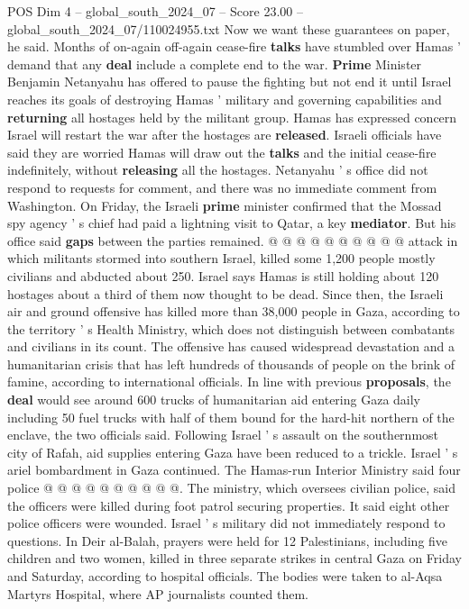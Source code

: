 \begin{textsample}{POS Dim 4 – global\_south\_2024\_07 – Score 23.00 – global\_south\_2024\_07/110024955.txt}
Now we want these guarantees on paper, he said.
Months of on-again off-again cease-fire \textbf{talks} have stumbled over Hamas ' demand that any \textbf{deal} include a complete end to the war. \textbf{Prime} Minister Benjamin Netanyahu has offered to pause the fighting but not end it until Israel reaches its goals of destroying Hamas ' military and governing capabilities and \textbf{returning} all hostages held by the militant group.
Hamas has expressed concern Israel will restart the war after the hostages are \textbf{released}.
Israeli officials have said they are worried Hamas will draw out the \textbf{talks} and the initial cease-fire indefinitely, without \textbf{releasing} all the hostages.
Netanyahu ' s office did not respond to requests for comment, and there was no immediate comment from Washington.
On Friday, the Israeli \textbf{prime} minister confirmed that the Mossad spy agency ' s chief had paid a lightning visit to Qatar, a key \textbf{mediator}.
But his office said \textbf{gaps} between the parties remained. @ @ @ @ @ @ @ @ @ @ attack in which militants stormed into southern Israel, killed some 1,200 people mostly civilians and abducted about 250.
Israel says Hamas is still holding about 120 hostages about a third of them now thought to be dead.
Since then, the Israeli air and ground offensive has killed more than 38,000 people in Gaza, according to the territory ' s Health Ministry, which does not distinguish between combatants and civilians in its count.
The offensive has caused widespread devastation and a humanitarian crisis that has left hundreds of thousands of people on the brink of famine, according to international officials.
In line with previous \textbf{proposals}, the \textbf{deal} would see around 600 trucks of humanitarian aid entering Gaza daily including 50 fuel trucks with half of them bound for the hard-hit northern of the enclave, the two officials said.
Following Israel ' s assault on the southernmost city of Rafah, aid supplies entering Gaza have been reduced to a trickle.
Israel ' s ariel bombardment in Gaza continued.
The Hamas-run Interior Ministry said four police @ @ @ @ @ @ @ @ @ @.
The ministry, which oversees civilian police, said the officers were killed during foot patrol securing properties.
It said eight other police officers were wounded.
Israel ' s military did not immediately respond to questions.
In Deir al-Balah, prayers were held for 12 Palestinians, including five children and two women, killed in three separate strikes in central Gaza on Friday and Saturday, according to hospital officials.
The bodies were taken to al-Aqsa Martyrs Hospital, where AP journalists counted them.

\end{textsample}
